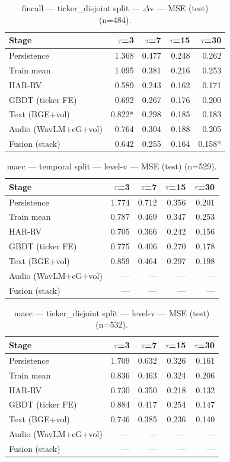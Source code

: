 \begin{table}[t]
\centering
\begin{tabular}{lrrrr}
\toprule
Stage & $\tau$=3 & $\tau$=7 & $\tau$=15 & $\tau$=30 \\
\midrule
Persistence & 1.368 & 0.477 & 0.248 & 0.262 \\
Train mean & 1.095 & 0.381 & 0.216 & 0.253 \\
HAR-RV & 0.589 & 0.243 & 0.162 & 0.171 \\
GBDT (ticker FE) & 0.692 & 0.267 & 0.176 & 0.200 \\
Text (BGE+vol) & 0.822* & 0.298 & 0.185 & 0.183 \\
Audio (WavLM+eG+vol) & 0.764 & 0.304 & 0.188 & 0.205 \\
Fusion (stack) & 0.642 & 0.255 & 0.164 & 0.158* \\
\bottomrule
\end{tabular}
\caption{fincall — ticker\_disjoint split — $\Delta$v — MSE (test) (n=484).}
\end{table}

\begin{table}[t]
\centering
\begin{tabular}{lrrrr}
\toprule
Stage & $\tau$=3 & $\tau$=7 & $\tau$=15 & $\tau$=30 \\
\midrule
Persistence & 1.774 & 0.712 & 0.356 & 0.201 \\
Train mean & 0.787 & 0.469 & 0.347 & 0.253 \\
HAR-RV & 0.705 & 0.366 & 0.242 & 0.156 \\
GBDT (ticker FE) & 0.775 & 0.406 & 0.270 & 0.178 \\
Text (BGE+vol) & 0.859 & 0.464 & 0.297 & 0.198 \\
Audio (WavLM+eG+vol) & — & — & — & — \\
Fusion (stack) & — & — & — & — \\
\bottomrule
\end{tabular}
\caption{maec — temporal split — level-v — MSE (test) (n=529).}
\end{table}

\begin{table}[t]
\centering
\begin{tabular}{lrrrr}
\toprule
Stage & $\tau$=3 & $\tau$=7 & $\tau$=15 & $\tau$=30 \\
\midrule
Persistence & 1.709 & 0.632 & 0.326 & 0.161 \\
Train mean & 0.836 & 0.463 & 0.324 & 0.206 \\
HAR-RV & 0.730 & 0.350 & 0.218 & 0.132 \\
GBDT (ticker FE) & 0.884 & 0.417 & 0.254 & 0.147 \\
Text (BGE+vol) & 0.746 & 0.385 & 0.236 & 0.140 \\
Audio (WavLM+eG+vol) & — & — & — & — \\
Fusion (stack) & — & — & — & — \\
\bottomrule
\end{tabular}
\caption{maec — ticker\_disjoint split — level-v — MSE (test) (n=532).}
\end{table}

